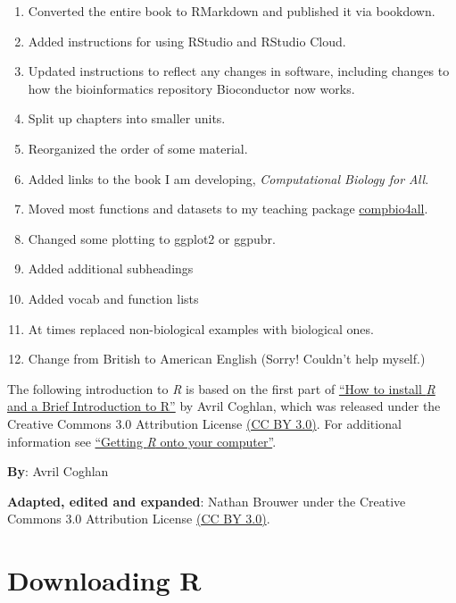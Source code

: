 \documentclass[
]{book}
\providecommand{\tightlist}{%
  \setlength{\itemsep}{0pt}\setlength{\parskip}{0pt}}
\begin{document}
\begin{enumerate}
\def\labelenumi{\arabic{enumi}.}
\tightlist
\item
  Converted the entire book to RMarkdown and published it via bookdown.
\item
  Added instructions for using RStudio and RStudio Cloud.
\item
  Updated instructions to reflect any changes in software, including changes to how the bioinformatics repository Bioconductor now works.
\item
  Split up chapters into smaller units.
\item
  Reorganized the order of some material.
\item
  Added links to the book I am developing, \emph{Computational Biology for All}.
\item
  Moved most functions and datasets to my teaching package \href{https://github.com/brouwern/compbio4all}{compbio4all}.
\item
  Changed some plotting to ggplot2 or ggpubr.
\item
  Added additional subheadings
\item
  Added vocab and function lists
\item
  At times replaced non-biological examples with biological ones.
\item
  Change from British to American English (Sorry! Couldn't help myself.)
\end{enumerate}

The following introduction to \emph{R} is based on the first part of \href{https://a-little-book-of-r-for-bioinformatics.readthedocs.io/en/latest/src/installr.html}{``How to install \emph{R} and a Brief Introduction to R''} by Avril Coghlan, which was released under the Creative Commons 3.0 Attribution License \href{https://creativecommons.org/licenses/by/3.0/}{(CC BY 3.0)}. For additional information see \href{https://brouwern.github.io/BOOK_R_Ecological_Data_Science/getting-r-onto-your-computer.html}{``Getting \emph{R} onto your computer''}.

\textbf{By}: Avril Coghlan

\textbf{Adapted, edited and expanded}: Nathan Brouwer under the Creative Commons 3.0 Attribution License \href{https://creativecommons.org/licenses/by/3.0/}{(CC BY 3.0)}.

\hypertarget{downloading-r}{%
\chapter{Downloading R}\label{downloading-r}}
\end{document}
